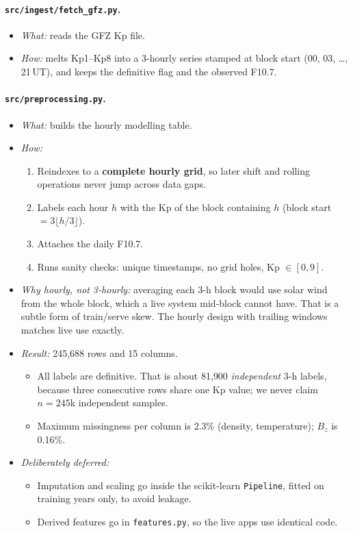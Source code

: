 \documentclass[11pt,a4paper]{article}
\newcommand{\code}[1]{\texttt{#1}}
\begin{document}
\paragraph{\code{src/ingest/fetch\_gfz.py}.}
\begin{itemize}
\item \textit{What:} reads the GFZ Kp file.
\item \textit{How:} melts Kp1--Kp8 into a 3-hourly series stamped at block start (00, 03, \dots, 21\,UT), and
keeps the definitive flag and the observed F10.7.
\end{itemize}

\paragraph{\code{src/preprocessing.py}.}
\begin{itemize}
\item \textit{What:} builds the hourly modelling table.
\item \textit{How:}
  \begin{enumerate}
  \item Reindexes to a \textbf{complete hourly grid}, so later shift and rolling operations never jump across
  data gaps.
  \item Labels each hour $h$ with the Kp of the block containing $h$ (block start $=3\lfloor h/3\rfloor$).
  \item Attaches the daily F10.7.
  \item Runs sanity checks: unique timestamps, no grid holes, Kp $\in[0,9]$.
  \end{enumerate}
\item \textit{Why hourly, not 3-hourly:} averaging each 3-h block would use solar wind from the whole block,
which a live system mid-block cannot have. That is a subtle form of train/serve skew. The hourly design with
trailing windows matches live use exactly.
\item \textit{Result:} 245{,}688 rows and 15 columns.
  \begin{itemize}
  \item All labels are definitive. That is about 81{,}900 \emph{independent} 3-h labels, because three
  consecutive rows share one Kp value; we never claim $n=245$k independent samples.
  \item Maximum missingness per column is 2.3\% (density, temperature); $B_z$ is 0.16\%.
  \end{itemize}
\item \textit{Deliberately deferred:}
  \begin{itemize}
  \item Imputation and scaling go inside the scikit-learn \code{Pipeline}, fitted on training years only, to
  avoid leakage.
  \item Derived features go in \code{features.py}, so the live apps use identical code.
  \end{itemize}
\end{itemize}
\end{document}
